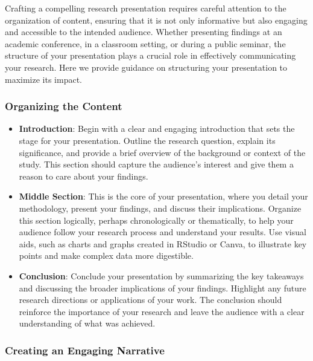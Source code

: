 \documentclass[
]{book}
\begin{document}
Crafting a compelling research presentation requires careful attention to the organization of content, ensuring that it is not only informative but also engaging and accessible to the intended audience. Whether presenting findings at an academic conference, in a classroom setting, or during a public seminar, the structure of your presentation plays a crucial role in effectively communicating your research. Here we provide guidance on structuring your presentation to maximize its impact.

\hypertarget{organizing-the-content}{%
\subsubsection*{Organizing the Content}\label{organizing-the-content}}

\begin{itemize}
\item
  \textbf{Introduction}: Begin with a clear and engaging introduction that sets the stage for your presentation. Outline the research question, explain its significance, and provide a brief overview of the background or context of the study. This section should capture the audience's interest and give them a reason to care about your findings.
\item
  \textbf{Middle Section}: This is the core of your presentation, where you detail your methodology, present your findings, and discuss their implications. Organize this section logically, perhaps chronologically or thematically, to help your audience follow your research process and understand your results. Use visual aids, such as charts and graphs created in RStudio or Canva, to illustrate key points and make complex data more digestible.
\item
  \textbf{Conclusion}: Conclude your presentation by summarizing the key takeaways and discussing the broader implications of your findings. Highlight any future research directions or applications of your work. The conclusion should reinforce the importance of your research and leave the audience with a clear understanding of what was achieved.
\end{itemize}

\hypertarget{creating-an-engaging-narrative}{%
\subsubsection*{Creating an Engaging Narrative}\label{creating-an-engaging-narrative}}
\end{document}
